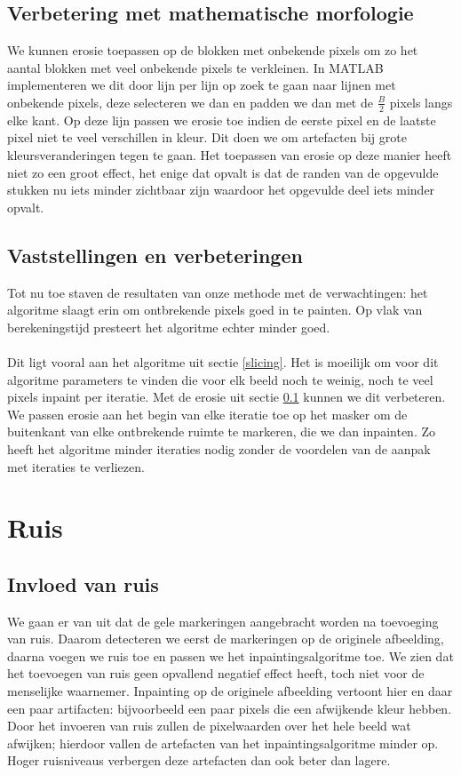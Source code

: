 \documentclass[titlepage]{article}
\begin{document}
\subsection{Verbetering met mathematische morfologie} \label{erosie}
We kunnen erosie toepassen op de blokken met onbekende pixels om zo het aantal blokken met veel onbekende pixels te verkleinen. In MATLAB implementeren we dit door lijn per lijn op zoek te gaan naar lijnen met onbekende pixels, deze selecteren we dan en padden we dan met de $\frac{B}{2}$ pixels langs elke kant. Op deze lijn passen we erosie toe indien de eerste pixel en de laatste pixel niet te veel verschillen in kleur. Dit doen we om artefacten bij grote kleursveranderingen tegen te gaan.
Het toepassen van erosie op deze manier heeft niet zo een groot effect, het enige dat opvalt is dat de randen van de opgevulde stukken nu iets minder zichtbaar zijn waardoor het opgevulde deel iets minder opvalt.

\subsection{Vaststellingen en verbeteringen}
Tot nu toe staven de resultaten van onze methode met de verwachtingen: het algoritme slaagt erin om ontbrekende pixels goed in te painten. Op vlak van berekeningstijd presteert het algoritme echter minder goed.\\ \\
Dit ligt vooral aan het algoritme uit sectie \ref{slicing}. Het is moeilijk om voor dit algoritme parameters te vinden die voor elk beeld noch te weinig, noch te veel pixels inpaint per iteratie. Met de erosie uit sectie \ref{erosie} kunnen we dit verbeteren. We passen erosie aan het begin van elke iteratie toe op het masker om de buitenkant van elke ontbrekende ruimte te markeren, die we dan inpainten. Zo heeft het algoritme minder iteraties nodig zonder de voordelen van de aanpak met iteraties te verliezen.

\section{Ruis} %

\subsection{Invloed van ruis} %
We gaan er van uit dat de gele markeringen aangebracht worden na toevoeging van ruis. Daarom detecteren we eerst de markeringen op de originele afbeelding, daarna voegen we ruis toe en passen we het inpaintingsalgoritme toe.
We zien dat het toevoegen van ruis geen opvallend negatief effect heeft, toch niet voor de menselijke waarnemer. Inpainting op de originele afbeelding vertoont hier en daar een paar artifacten: bijvoorbeeld een paar pixels die een afwijkende kleur hebben. Door het invoeren van ruis zullen de pixelwaarden over het hele beeld wat afwijken; hierdoor vallen de artefacten van het inpaintingsalgoritme minder op. Hoger ruisniveaus verbergen deze artefacten dan ook beter dan lagere. 
\end{document}

